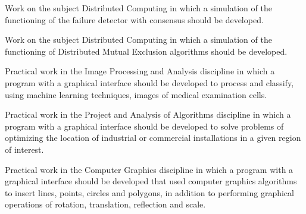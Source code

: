 \documentclass[10pt,a4paper,ragged2e,withhyper]{altacv}
\begin{document}
\begin{paracol}{2}
            Work on the subject Distributed Computing in which a simulation of the functioning of the failure detector with consensus should be developed.\\
            \divider

            Work on the subject Distributed Computing in which a simulation of the functioning of Distributed Mutual Exclusion algorithms should be developed.\\
            \divider

            Practical work in the Image Processing and Analysis discipline in which a program with a graphical interface should be developed to process and classify, using machine learning techniques, images of medical examination cells.\\
            \divider
            
            Practical work in the Project and Analysis of Algorithms discipline in which a program with a graphical interface should be developed to solve problems of optimizing the location of industrial or commercial installations in a given region of interest.\\
            \divider

            Practical work in the Computer Graphics discipline in which a program with a graphical interface should be developed that used computer graphics algorithms to insert lines, points, circles and polygons, in addition to performing graphical operations of rotation, translation, reflection and scale.\\
            \divider


\end{paracol}
\end{document}

